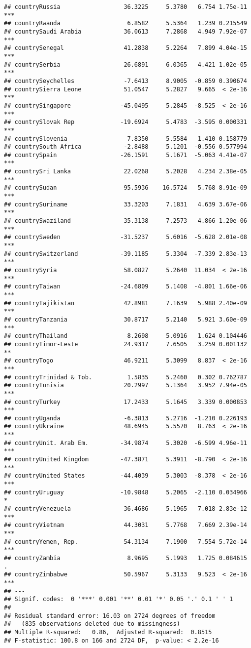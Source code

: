 \documentclass[
  11pt,
]{article}
\begin{document}
\begin{verbatim}
## countryRussia                  36.3225     5.3780   6.754 1.75e-11 ***
## countryRwanda                   6.8582     5.5364   1.239 0.215549    
## countrySaudi Arabia            36.0613     7.2868   4.949 7.92e-07 ***
## countrySenegal                 41.2838     5.2264   7.899 4.04e-15 ***
## countrySerbia                  26.6891     6.0365   4.421 1.02e-05 ***
## countrySeychelles              -7.6413     8.9005  -0.859 0.390674    
## countrySierra Leone            51.0547     5.2827   9.665  < 2e-16 ***
## countrySingapore              -45.0495     5.2845  -8.525  < 2e-16 ***
## countrySlovak Rep             -19.6924     5.4783  -3.595 0.000331 ***
## countrySlovenia                 7.8350     5.5584   1.410 0.158779    
## countrySouth Africa            -2.8488     5.1201  -0.556 0.577994    
## countrySpain                  -26.1591     5.1671  -5.063 4.41e-07 ***
## countrySri Lanka               22.0268     5.2028   4.234 2.38e-05 ***
## countrySudan                   95.5936    16.5724   5.768 8.91e-09 ***
## countrySuriname                33.3203     7.1831   4.639 3.67e-06 ***
## countrySwaziland               35.3138     7.2573   4.866 1.20e-06 ***
## countrySweden                 -31.5237     5.6016  -5.628 2.01e-08 ***
## countrySwitzerland            -39.1185     5.3304  -7.339 2.83e-13 ***
## countrySyria                   58.0827     5.2640  11.034  < 2e-16 ***
## countryTaiwan                 -24.6809     5.1408  -4.801 1.66e-06 ***
## countryTajikistan              42.8981     7.1639   5.988 2.40e-09 ***
## countryTanzania                30.8717     5.2140   5.921 3.60e-09 ***
## countryThailand                 8.2698     5.0916   1.624 0.104446    
## countryTimor-Leste             24.9317     7.6505   3.259 0.001132 ** 
## countryTogo                    46.9211     5.3099   8.837  < 2e-16 ***
## countryTrinidad & Tob.          1.5835     5.2460   0.302 0.762787    
## countryTunisia                 20.2997     5.1364   3.952 7.94e-05 ***
## countryTurkey                  17.2433     5.1645   3.339 0.000853 ***
## countryUganda                  -6.3813     5.2716  -1.210 0.226193    
## countryUkraine                 48.6945     5.5570   8.763  < 2e-16 ***
## countryUnit. Arab Em.         -34.9874     5.3020  -6.599 4.96e-11 ***
## countryUnited Kingdom         -47.3871     5.3911  -8.790  < 2e-16 ***
## countryUnited States          -44.4039     5.3003  -8.378  < 2e-16 ***
## countryUruguay                -10.9848     5.2065  -2.110 0.034966 *  
## countryVenezuela               36.4686     5.1965   7.018 2.83e-12 ***
## countryVietnam                 44.3031     5.7768   7.669 2.39e-14 ***
## countryYemen, Rep.             54.3134     7.1900   7.554 5.72e-14 ***
## countryZambia                   8.9695     5.1993   1.725 0.084615 .  
## countryZimbabwe                50.5967     5.3133   9.523  < 2e-16 ***
## ---
## Signif. codes:  0 '***' 0.001 '**' 0.01 '*' 0.05 '.' 0.1 ' ' 1
## 
## Residual standard error: 16.03 on 2724 degrees of freedom
##   (835 observations deleted due to missingness)
## Multiple R-squared:   0.86,  Adjusted R-squared:  0.8515 
## F-statistic: 100.8 on 166 and 2724 DF,  p-value: < 2.2e-16
\end{verbatim}
\end{document}
